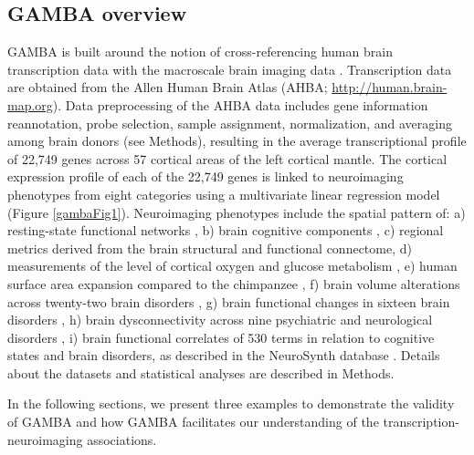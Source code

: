 \begin{refsection}
\subsection*{GAMBA overview}
GAMBA is built around the notion of cross-referencing human brain transcription data with the macroscale brain imaging data \citep{Anderson2018TheTL,krienen2016transcriptional,Romme2017ConnectomeDA,Wei2019GeneticMA}. Transcription data are obtained from the Allen Human Brain Atlas (AHBA; \url{http://human.brain-map.org}). Data preprocessing of the AHBA data includes gene information reannotation, probe selection, sample assignment, normalization, and averaging among brain donors (see Methods), resulting in the average transcriptional profile of 22,749 genes across 57 cortical areas of the left cortical mantle. The cortical expression profile of each of the 22,749 genes is linked to neuroimaging phenotypes from eight categories using a multivariate linear regression model (Figure \ref{gambaFig1}). Neuroimaging phenotypes include the spatial pattern of: a) resting-state functional networks \citep{thomas2011organization}, b) brain cognitive components \citep{Yeo2016GraphMO}, c) regional metrics derived from the brain structural and functional connectome, d) measurements of the level of cortical oxygen and glucose metabolism \citep{Vaishnavi2010RegionalAG}, e) human surface area expansion compared to the chimpanzee \citep{Wei2019GeneticMA}, f) brain volume alterations across twenty-two brain disorders \citep{Fox2002MappingCA,Fox2005BrainMapTO,Laird2005BrainMapT}, g) brain functional changes in sixteen brain disorders \citep{Fox2005BrainMapTO,Fox2002MappingCA,Laird2005BrainMapT}, h) brain dysconnectivity across nine psychiatric and neurological disorders \citep{Lange2019SharedVF}, i) brain functional correlates of 530 terms in relation to cognitive states and brain disorders, as described in the NeuroSynth database \citep{Yarkoni2011LargescaleAS}. Details about the datasets and statistical analyses are described in Methods.

In the following sections, we present three examples to demonstrate the validity of GAMBA and how GAMBA facilitates our understanding of the transcription-neuroimaging associations.



\end{refsection}
